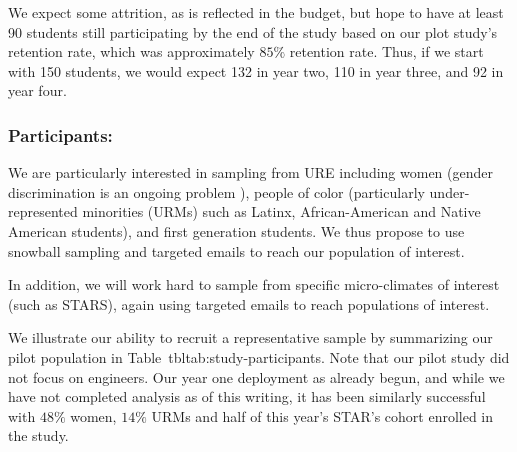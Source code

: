 We expect some attrition, as is reflected in the budget, but hope to have at least 90 students still participating by the end of the study based on our plot study's retention rate, which was approximately $85\%$ retention rate. Thus, if we start with 150 students, we would expect 132 in year two, 110 in year three, and 92 in year four. 


\subsubsection{Participants:}
\label{sec:study-participants}
We are particularly interested in sampling from URE including women (gender discrimination is an ongoing problem \cite{johnson2018sexual}), people of color (particularly under-represented minorities (URMs) such as Latinx, African-American and Native American students), and first generation students.  We thus propose to use snowball sampling and targeted emails to reach our population of interest.

In addition, we will work hard to sample from specific  micro-climates of interest (such as STARS), again using targeted emails to reach populations of interest.

We illustrate our ability to recruit a representative sample by summarizing our pilot population in Table~tbl{tab:study-participants}. Note that our pilot study did not focus on engineers. Our year one deployment as already begun, and while we have not completed analysis as of this writing, it has been similarly successful with $48\%$ women, $14\%$ URMs and half of this year's STAR's cohort enrolled in the study. 

